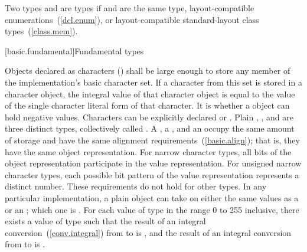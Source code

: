 \pnum
{}%
Two types   and   are
 types
if  and  are the same type,
layout-compatible enumerations~(\ref{dcl.enum}), or
layout-compatible standard-layout class types~(\ref{class.mem}).

[basic.fundamental]{Fundamental types}

\pnum
{}%
%
%
%
%
%
%
%
Objects declared as characters () shall be large enough to
store any member of the implementation's basic character set. If a
character from this set is stored in a character object, the integral
value of that character object is equal to the value of the single
character literal form of that character. It is 
whether a  object can hold negative values.
%
%
%
Characters can be explicitly declared  or
.
%
Plain , , and  are
three distinct types, collectively called .
A , a , and an
 occupy the same amount of storage and have the
same alignment requirements~(\ref{basic.align}); that is, they have the
same object representation. For narrow character types, all bits of the object
representation participate in the value representation. For unsigned narrow
character types, each possible bit pattern of the value representation
represents a distinct number. These requirements do not hold for other types. In
any particular implementation, a plain  object can take on
either the same values as a  or an ; which one is .
For each value  of type  in the range
0 to 255 inclusive, there exists a value  of type
 such that the result of an integral
conversion~(\ref{conv.integral}) from  to  is
, and the result of an integral conversion from
 to  is .

